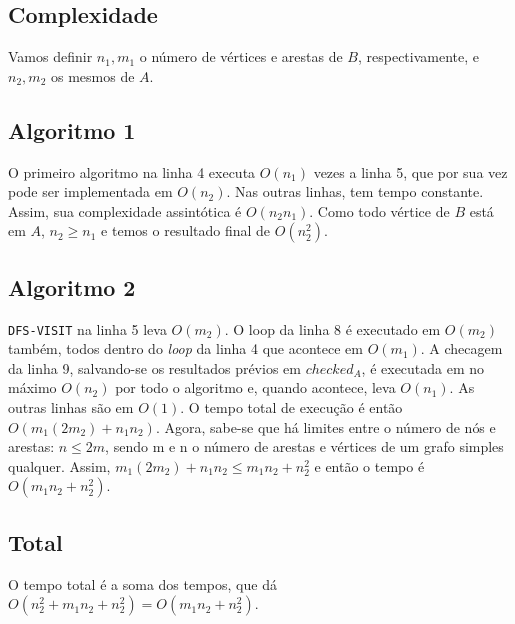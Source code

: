 \documentclass[9pt]{article}
\newcommand{\tit}[1]{\textit{#1}}
\newcommand{\ttt}[1]{\texttt{#1}}
\begin{document}
\begin{multicols}{2}
\section{Complexidade}
Vamos definir $n_1, m_1$ o número de vértices e arestas de $B$, respectivamente,
e $n_2, m_2$ os mesmos de $A$.

\subsection{Algoritmo 1}
O primeiro algoritmo na linha 4 executa $O(n_1)$ vezes a linha 5, que por sua
vez pode ser implementada em $O(n_2)$. Nas outras linhas, tem tempo constante.
Assim, sua complexidade assintótica é $O(n_2n_1)$. Como todo vértice de $B$ está
em $A$, $n_2 \ge n_1$ e temos o resultado final de $O(n_{2}^2)$.

\subsection{Algoritmo 2}
\ttt{DFS-VISIT} na linha 5 leva $O(m_2)$. O loop da linha 8 é executado 
em $O(m_2)$ também, todos dentro do \tit{loop} da linha 4 que acontece em 
$O(m_1)$. A checagem da linha 9, salvando-se os resultados prévios
em $checked_A$, é executada em no máximo $O(n_2)$ por todo o algoritmo e, 
quando acontece, leva $O(n_1)$.  As outras linhas são em $O(1)$. 
O tempo total de execução é então $O(m_1(2m_2) + n_1n_2)$.
Agora, sabe-se que há limites entre o número de nós e arestas:
$n \le 2m$,
sendo m e n o número de arestas e vértices de um grafo simples qualquer.
Assim, $m_1(2m_2) + n_1n_2 \le m_1n_2 + n_{2}^2$ e então o tempo é 
$O(m_1n_2 + n_{2}^2)$.

\subsection{Total}
O tempo total é a soma dos tempos, que dá $O(n_{2}^2 + m_1n_2 + n_{2}^2) = 
O(m_1n_2 + n_{2}^2)$.

\printbibliography

\end{multicols}
\end{document}
